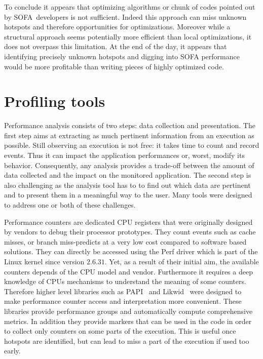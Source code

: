 To conclude it appears that optimizing algorithms or chunk of codes pointed out by \gls{SOFA} developers is not sufficient.
Indeed this approach can miss unknown hotspots and therefore opportunities for optimizations.
Moreover while a structural approach seems potentially more efficient than local optimizations, it does not overpass this limitation.
At the end of the day, it appears that identifying precisely unknown hotspots and digging into \gls{SOFA} performance would be more profitable than writing pieces of highly optimized code.

\section{Profiling tools}
\label{sec:prof-tools}

Performance analysis consists of two steps: data collection and presentation.
The first step aims at extracting as much pertinent information from an execution as possible.
Still observing an execution is not free: it takes time to count and record events.
Thus it can impact the application performances or, worst, modify its behavior.
Consequently, any analysis provides a trade-off between the amount of data collected and the impact on the monitored application.
The second step is also challenging as the analysis tool has to to find out which data are pertinent and to present them in a meaningful way to the user.
Many tools were designed to address one or both of these challenges.

Performance counters are dedicated \gls{CPU} registers that were originally designed by vendors to debug their processor prototypes.
They count events such as cache misses, or branch miss-predicts at a very low cost compared to software based solutions.
They can directly be accessed using the \gls{Perf} driver which is part of the \gls{Linux} kernel since version $2.6.31$.
Yet, as a result of their initial aim, the available counters depends of the \gls{CPU} model and vendor.
Furthermore it requires a deep knowledge of \glspl{CPU} mechanisms to understand the meaning of some counters.
Therefore higher level libraries such as \gls{PAPI}~\cite{Browne00Portable,Malony11Parallel,Weaver13PAPI} and \gls{Likwid}~\cite{Treibig10LIKWID} were designed to make performance counter access and interpretation more convenient.
These libraries provide performance groups and automatically compute comprehensive metrics.
In addition they provide markers that can be used in the code in order to collect only counters on some parts of the execution.
This is useful once hotspots are identified, but can lead to miss a part of the execution if used too early.


